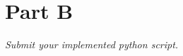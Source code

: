 \documentclass[12pt,twoside]{article}
\begin{document}
\begin{problems}
\begin{problemparts}
\end{problemparts}

\problem
\begin{problemparts}
\problempart 
\end{problemparts}
\problem
\problem

\section*{Part B}

\emph{Submit your implemented python script.}

\end{problems}
\end{document}
